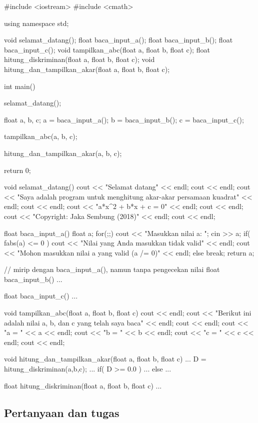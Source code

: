 \documentclass[a4paper,11pt]{extarticle}
\begin{document}
\begin{cppcode}
#include <iostream>
#include <cmath>

using namespace std;

void selamat_datang();
float baca_input_a();
float baca_input_b();
float baca_input_c();
void tampilkan_abc(float a, float b, float c);
float hitung_diskriminan(float a, float b, float c);
void hitung_dan_tampilkan_akar(float a, float b, float c);

int main()
{
  selamat_datang();

  float a, b, c;
  a = baca_input_a();
  b = baca_input_b();
  c = baca_input_c();

  tampilkan_abc(a, b, c);

  hitung_dan_tampilkan_akar(a, b, c);
  
  return 0;
}

void selamat_datang()
{
  cout << "Selamat datang" << endl;
  cout << endl;
  cout << "Saya adalah program untuk menghitung akar-akar persamaan kuadrat" << endl;
  cout << endl;
  cout << "a*x^2 + b*x + c = 0" << endl;
  cout << endl;
  cout << "Copyright: Jaka Sembung (2018)" << endl;
  cout << endl;
}

float baca_input_a()
{
  float a;
  for(;;) {
    cout << "Masukkan nilai a: ";
    cin >> a;
    if( fabs(a) <= 0 ) {
      cout << "Nilai yang Anda masukkan tidak valid" << endl;
      cout << "Mohon masukkan nilai a yang valid (a /= 0)" << endl;
    }
    else break;
  }
  return a;
}

// mirip dengan baca_input_a(), namun tanpa pengecekan nilai
float baca_input_b()
{...}

float baca_input_c()
{...}

void tampilkan_abc(float a, float b, float c)
{
  cout << endl;
  cout << "Berikut ini adalah nilai a, b, dan c yang telah saya baca" << endl;
  cout << endl;
  cout << "a = " << a << endl;
  cout << "b = " << b << endl;
  cout << "c = " << c << endl;
  cout << endl;
}

void hitung_dan_tampilkan_akar(float a, float b, float c)
{
  ...
  D = hitung_diskriminan(a,b,c);
  ...
  if( D >= 0.0 ) {
    ...
  }
  else {
    ...
  }
}

float hitung_diskriminan(float a, float b, float c)
{ ... }
\end{cppcode}


\subsection{Pertanyaan dan tugas}
\end{document}
